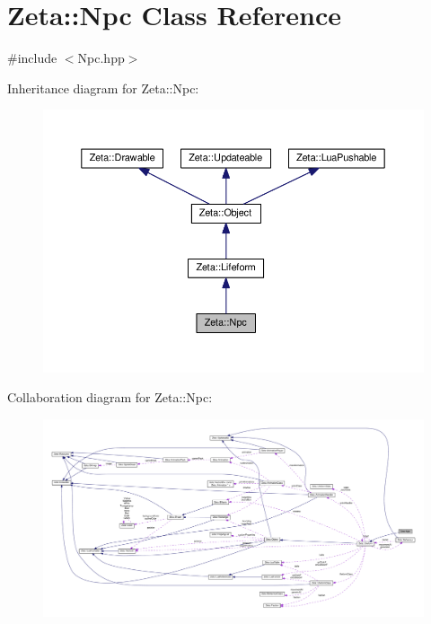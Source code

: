 \hypertarget{classZeta_1_1Npc}{\section{Zeta\+:\+:Npc Class Reference}
\label{classZeta_1_1Npc}
}


{\ttfamily \#include $<$Npc.\+hpp$>$}



Inheritance diagram for Zeta\+:\+:Npc\+:\nopagebreak
\begin{figure}[H]
\begin{center}
\leavevmode
\includegraphics[width=350pt]{classZeta_1_1Npc__inherit__graph}
\end{center}
\end{figure}


Collaboration diagram for Zeta\+:\+:Npc\+:
\nopagebreak
\begin{figure}[H]
\begin{center}
\leavevmode
\includegraphics[width=350pt]{classZeta_1_1Npc__coll__graph}
\end{center}
\end{figure}
